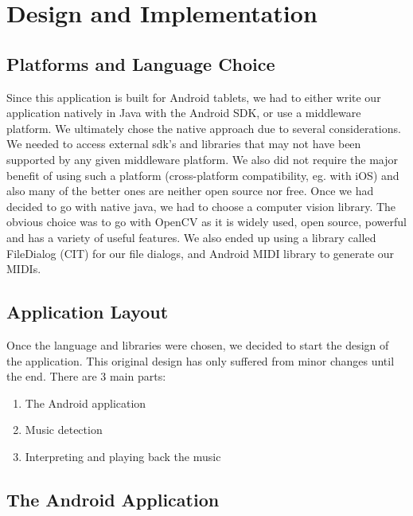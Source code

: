 \section{Design and Implementation}

\subsection{Platforms and Language Choice}

Since this application is built for Android tablets, we had to either write our application natively in Java with the Android SDK, or use a middleware platform. We ultimately chose the native approach due to several considerations. We needed to access external sdk's and libraries that may not have been supported by any given middleware platform. We also did not require the major benefit of using such a platform (cross-platform compatibility, eg. with iOS) and also many of the better ones are neither open source nor free. 
Once we had decided to go with native java, we had to choose a computer vision library. The obvious choice was to go with OpenCV as it is widely used, open source, powerful and has a variety of useful features. We also ended up using a library called FileDialog (CIT) for our file dialogs, and Android MIDI library to generate our MIDIs.

\subsection{Application Layout}

Once the language and libraries were chosen, we decided to start the design of the application. This original design has only suffered from minor changes until the end. There are 3 main parts: 
\begin{enumerate}
\item{The Android application}
\item{Music detection}
\item{Interpreting and playing back the music}
\end{enumerate}

\subsection{The Android Application}

